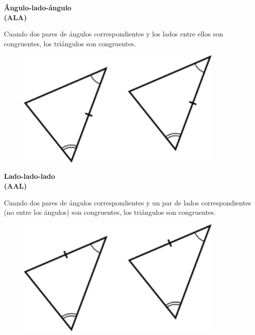 \begin{tcbitemize}
    \tcbitem
    \begin{center}\bfseries
        Ángulo-lado-ángulo\\ (ALA)
    \end{center}
    Cuando dos pares de ángulos correspondientes y los lados entre ellos son congruentes, los triángulos son congruentes.
    \begin{figure}[H]
        \includegraphics[width=0.9\textwidth]{../images/criterioALA}
        \caption{}
        \label{fig:criterioALA}
    \end{figure}

    \tcbitem[]  \begin{center}\bfseries
        Lado-lado-lado \\ (AAL)
    \end{center}
    Cuando dos pares de ángulos correspondientes y un par de lados correspondientes (no entre los ángulos) son congruentes, los triángulos son congruentes.

    \begin{figure}[H]
        \includegraphics[width=0.9\textwidth]{../images/criterioAAL}
        \caption{}
        \label{fig:criterioAAL}
    \end{figure}
\end{tcbitemize}